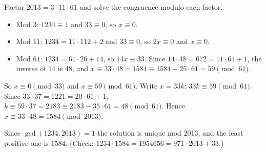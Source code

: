 Factor $2013=3\cdot11\cdot61$ and solve the congruence modulo each factor.
\begin{itemize}
\item Mod $3$: $1234\equiv1$ and $33\equiv0$, so $x\equiv0$.
\item Mod $11$: $1234=11\cdot112+2$ and $33\equiv0$, so $2x\equiv0$ and $x\equiv0$.
\item Mod $61$: $1234=61\cdot20+14$, so $14x\equiv33$. Since $14\cdot48=672=11\cdot61+1$, the inverse of $14$ is $48$, and $x\equiv33\cdot48=1584\equiv1584-25\cdot61=59\pmod{61}$.
\end{itemize}
So $x\equiv0\pmod{33}$ and $x\equiv59\pmod{61}$. Write $x=33k$: $33k\equiv59\pmod{61}$. Since $33\cdot37=1221=20\cdot61+1$, $k\equiv59\cdot37=2183\equiv2183-35\cdot61=48\pmod{61}$. Hence $x\equiv33\cdot48=1584\pmod{2013}$.

Since $\gcd(1234,2013)=1$ the solution is unique mod $2013$, and the least positive one is $\boxed{1584}$. (Check: $1234\cdot1584=1954656=971\cdot2013+33$.)
